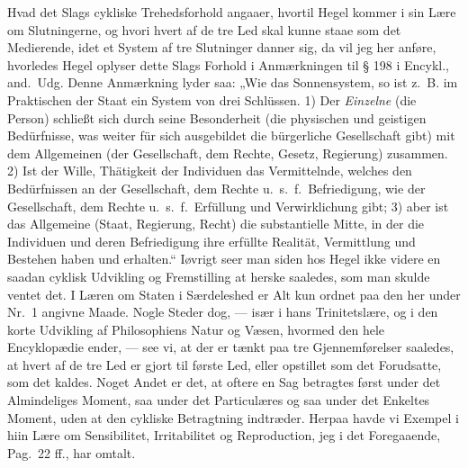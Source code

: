 \documentclass[12pt,a4paper]{book}
\newcommand{\apage}[1]{\marginnote{\footnotesize\textit{[#1]}}}
\begin{document}
Hvad det Slags cykliske Trehedsforhold angaaer, hvortil Hegel kommer i sin Lære
om Slutningerne, og hvori hvert af de tre Led skal kunne staae som det
Medierende, idet et System af tre Slutninger danner sig, da vil jeg her anføre,
hvorledes Hegel oplyser dette Slags Forhold i Anmærkningen til § 198 i
Encykl., and.\ Udg. Denne Anmærkning lyder saa: „Wie das Sonnensystem, so ist
z.\ B. im Praktischen der Staat ein System von drei Schlüssen. 1) Der \emph{Einzelne}
(die Person) schließt sich durch seine Besonderheit (die physischen und
geistigen Bedürfnisse, was weiter für sich ausgebildet die bürgerliche
Gesellschaft gibt) mit dem Allgemeinen (der Gesellschaft, dem Rechte, Gesetz,
Regierung) zusammen. 2) Ist der Wille, Thätigkeit der Individuen das
Vermittelnde, welches den Bedürfnissen an der Gesellschaft, dem Rechte u.\ s.\
f.\ Befriedigung, wie der Gesellschaft, dem Rechte u.\ s.\ f.\ Erfüllung und
Verwirklichung gibt; 3) aber ist das Allgemeine (Staat, Regierung, Recht) die
substantielle Mitte, in der die Individuen und deren Befriedigung ihre erfüllte
Realität, Vermittlung und Bestehen haben und erhalten.“ Iøvrigt seer man siden
hos Hegel ikke videre en saadan cyklisk Udvikling og Fremstilling at herske
saaledes, som man skulde ventet det. I Læren om Staten i Særdeleshed er Alt kun
ordnet paa den her under Nr.\ 1 angivne Maade. Nogle Steder dog, --- især i
hans Trinitetslære, og i den korte Udvikling af Philosophiens Natur og Væsen,
hvormed den hele Encyklopædie ender, --- see vi, at der er tænkt paa tre
\apage{130} Gjennemførelser saaledes, at hvert af de tre Led er gjort til første Led, eller
opstillet som det Forudsatte, som det kaldes. Noget Andet er det, at oftere en
Sag betragtes først under det Almindeliges Moment, saa under det Particulæres
og saa under det Enkeltes Moment, uden at den cykliske Betragtning indtræder.
Herpaa havde vi Exempel i hiin Lære om Sensibilitet, Irritabilitet og
Reproduction, jeg i det Foregaaende, Pag.\ 22 ff., har omtalt.
\end{document}
